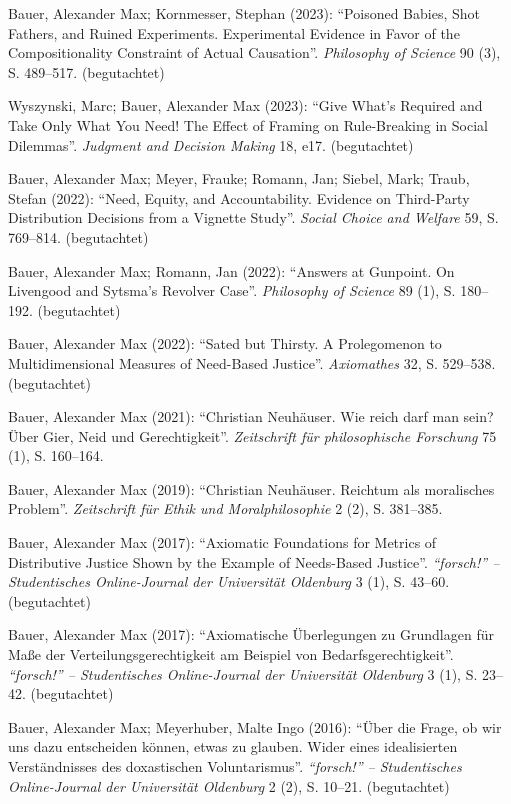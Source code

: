 \documentclass[a4paper,10pt]{article}
\newenvironment{literature}{%
   \parskip6pt\parindent0pt\raggedright
   \def\lititem{\hangindent=1cm\hangafter1}}{%
   \par\ignorespaces}
\begin{document}
\begin{literature}
\lititem Bauer, Alexander Max; Kornmesser, Stephan (2023): \enquote{Poisoned Babies, Shot Fathers, and Ruined Experiments. Experimental Evidence in Favor of the Compositionality Constraint of Actual Causation}. \textit{Philosophy of Science} 90 (3), S. 489--517. (begutachtet)

\lititem Wyszynski, Marc; Bauer, Alexander Max (2023): \enquote{Give What's Required and Take Only What You Need! The Effect of Framing on Rule-Breaking in Social Dilemmas}. \textit{Judgment and Decision Making} 18, e17. (begutachtet)

\lititem Bauer, Alexander Max; Meyer, Frauke; Romann, Jan; Siebel, Mark; Traub, Stefan (2022): \enquote{Need, Equity, and Accountability. Evidence on Third-Party Distribution Decisions from a Vignette Study}. \textit{Social Choice and Welfare} 59, S. 769--814. (begutachtet)

\lititem Bauer, Alexander Max; Romann, Jan (2022): \enquote{Answers at Gunpoint. On Livengood and Sytsma's Revolver Case}. \textit{Philosophy of Science} 89 (1), S. 180--192. (begutachtet)

\lititem Bauer, Alexander Max (2022): \enquote{Sated but Thirsty. A Prolegomenon to Multidimensional Measures of Need-Based Justice}. \textit{Axiomathes} 32, S. 529--538. (begutachtet)

\lititem Bauer, Alexander Max (2021): \enquote{Christian Neuhäuser. Wie reich darf man
sein? Über Gier, Neid und Gerechtigkeit}. \textit{Zeitschrift für philosophische Forschung} 75 (1), S. 160--164.

\lititem Bauer, Alexander Max (2019): \enquote{Christian Neuhäuser. Reichtum als moralisches Problem}. \textit{Zeitschrift für Ethik und Moralphilosophie} 2 (2), S. 381--385.

\lititem Bauer, Alexander Max (2017): \enquote{Axiomatic Foundations for Metrics of Distributive Justice Shown by the Example of Needs-Based Justice}. \textit{\enquote{forsch!} -- Studentisches Online-Journal der Universität Oldenburg} 3 (1), S. 43--60. (begutachtet)

\lititem Bauer, Alexander Max (2017): \enquote{Axiomatische Überlegungen zu Grundlagen für Maße der Verteilungsgerechtigkeit am Beispiel von Bedarfsgerechtigkeit}. \textit{\enquote{forsch!} -- Studentisches Online-Journal der Universität Oldenburg} 3 (1), S. 23--42. (begutachtet)

\lititem Bauer, Alexander Max; Meyerhuber, Malte Ingo (2016): \enquote{Über die Frage, ob wir uns dazu entscheiden können, etwas zu glauben. Wider eines idealisierten Verständnisses des doxastischen Voluntarismus}. \textit{\enquote{forsch!} -- Studentisches Online-Journal der Universität Oldenburg} 2 (2), S. 10--21. (begutachtet)
\end{literature}
\end{document}

